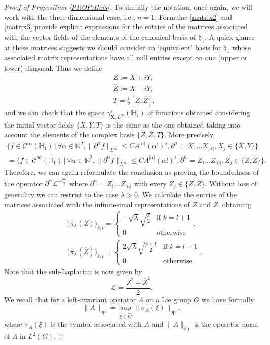 \documentclass[12pt,oneside,a4paper]{book}
\numberwithin{equation}{section}     %
\theoremstyle{plain}
\theoremstyle{definition}
\DeclareMathOperator{\OP}{op}
\newcommand{\N}{{\mathbb N}}
\newcommand{\h}{{\mathbb H}}
\newcommand{\slp}{{\mathcal L}}
\begin{document}
\begin{proof}[Proof of Proposition \ref{PROP:Heis}]
	To simplify the notation, once again, we will work with the three-dimensional case, i.e., $n=1$.  Formulae \eqref{matrix2} and \eqref{matrix3} provide explicit expressions for the entries of the matrices associated with the vector fields of the elements of the canonical basis of $\mathfrak h_1$. A quick glance at these matrices suggests we should consider an `equivalent' basis for $\mathfrak h_1$ whose associated matrix representations have all null entries except on one (upper or lower) diagonal. Thus we define
	\begin{align*}
	&Z:=X+iY,\\
	&\overline Z:=X-iY,\\
	&T=\frac{i}{2}[Z,\overline Z],
	\end{align*}
	and we can check that the space $\gamma^s_{\mathbf{X},L^\infty}(\h_1)$ of functions obtained considering the initial vector fields $\{X,Y,T\}$ is the same as the one obtained taking into account the elements of the complex basis $\{Z,\overline Z,T\}$. More precisely,
	\begin{multline*}
	\Big\{ f\in \mathcal C^\infty(\h_1)\,|\, \forall \alpha\in\N^2,\|\partial^\alpha f\|_{L^\infty}\leq CA^{|\alpha|}(\alpha!)^s,\partial^\alpha=X_1\dots X_{|\alpha|}, X_j\in\{X,Y\}\Big\}
	\\ =
	\Big\{f\in \mathcal C^\infty(\h_1)\,|\, \forall \alpha\in\N^2,\|\partial^\alpha f\|_{L^\infty}\leq CA^{|\alpha|}(\alpha!)^s,\partial^\alpha=Z_1\dots Z_{|\alpha|}, Z_j\in \big\{ Z,\overline Z \big\}\Big\}.
	\end{multline*}
	Therefore, we can again reformulate the conclusion as proving the boundedness of the operator $\partial^\alpha\slp^{-\frac{|\alpha|}{2}}$ where $\partial^\alpha=Z_1\dots Z_{|\alpha|}$ with every $Z_j\in\{Z,\overline Z\}$.
	Without loss of generality we can restrict to the case $\lambda>0$. We calculate the entries of the matrices associated with the infinitesimal representations of $Z$ and $\overline Z$, obtaining
	\begin{align}\label{mat1}
	&\big(\pi_\lambda(Z)\big)_{k,l}=
	\begin{cases}
	-\sqrt{\lambda}\sqrt{\frac{k}{2}}&\text{if }k=l+1\\
	0&\text{otherwise}
	\end{cases},\\
	\label{mat2}&\big(\pi_\lambda(\overline Z)\big)_{k,l}=
	\begin{cases}
	2\sqrt{\lambda}\sqrt{\frac{k+1}{2}}&\text{if }k=l-1\\
	0&\text{otherwise}
	\end{cases}.
	\end{align}
	Note that the sub-Laplacian is now given by $$\slp=\frac{Z^2 +\overline Z^2}{2}.$$
	We recall that for a left-invariant operator $A$ on a Lie group $G$ we have formally
	\[
	\|A\|_{\OP}=\sup_{\xi\in\widehat G}\|\sigma_A(\xi)\|_{\OP},
	\]
	where $\sigma_A(\xi)$ is the symbol associated with $A$ and $\|A\|_{\OP}$ is the operator norm of $A$ in $L^2(G)$.
	

\end{proof}
\end{document}
